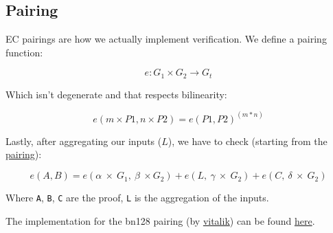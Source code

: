 \documentclass{article}
\begin{document}
\subsection{Pairing}

EC pairings are how we actually implement verification. We define a pairing function:

\[ e: G_1 \times  G_2 \rightarrow G_t \]

Which isn't degenerate and that respects bilinearity:

\[ e ( m \times P1, n \times P2) = e ( P1, P2 ) ^ ( m * n ) \]

Lastly, after aggregating our inputs (\(L\)), we have to check (starting from the \href{https://xn--2-umb.com/22/pairings/index.html}{pairing}):

\[ e(A, B) = e(\alpha \ \times \ G_1, \ \beta \ \times G_2) + e(L, \ \gamma \ \times \ G_2) + e(C, \ \delta \ \times \ G_2)\]

Where \texttt{A}, \texttt{B}, \texttt{C} are the proof, \texttt{L} is the aggregation of the inputs.

The implementation for the bn128 pairing (by \href{https://vitalik.ca}{vitalik}) can be found \href{https://github.com/ethereum/py_pairing/blob/master/py_ecc/bn128/bn128_pairing.py#L68}{here}.
\end{document}
